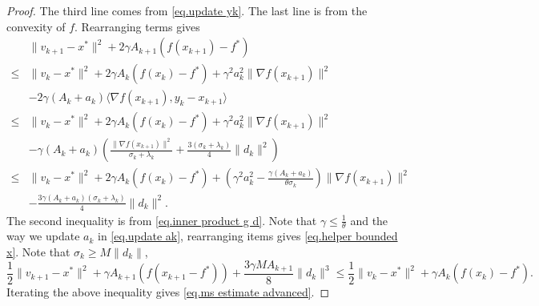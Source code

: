 \documentclass{mcom-l}
\numberwithin{equation}{section}
\begin{document}
\begin{proof}
    The third line comes from \eqref{eq.update yk}. The last line is from the convexity of $f$. Rearranging terms gives
    \begin{equation*}
        \begin{aligned}
                 & \|v_{k+1}-x^*\|^2 +2\gamma A_{k+1} \left (f(x_{k+1})-f^*\right)                                                                                \\
            \leq & \|v_k-x^*\|^2+2\gamma A_k \left (f(x_k)-f^*\right )+\gamma^2 a_k^2 \|\nabla f(x_{k+1})\|^2                                                     \\
                 & -2\gamma \left (A_k+a_k\right)\langle \nabla f(x_{k+1}), y_k-x_{k+1} \rangle                                                                   \\
            \leq & \|v_k-x^*\|^2+2\gamma A_k \left (f(x_k)-f^*\right )+\gamma^2 a_k^2 \|\nabla f(x_{k+1})\|^2                                                     \\
                 & -\gamma \left (A_k+a_k\right)\left (\frac{\|\nabla f(x_{k+1})\|^2}{\sigma_k+\lambda_k}+\frac{3(\sigma_k+\lambda_k)}{4}\|d_k\|^2\right)         \\
            \leq & \|v_k-x^*\|^2+2\gamma A_k \left (f(x_k)-f^*\right )+\left(\gamma^2 a_k^2-\frac{\gamma(A_k+a_k)}{\theta \sigma_k}\right)\|\nabla f(x_{k+1})\|^2 \\
                 & -\frac{3\gamma(A_k+a_k)(\sigma_k+\lambda_k)}{4}\|d_k\|^2.
        \end{aligned}
    \end{equation*}
    The second inequality is from \eqref{eq.inner product g d}. Note that $\gamma \leq \frac{1}{\theta}$ and the way we update $a_k$ in \eqref{eq.update ak}, rearranging items gives \eqref{eq.helper bounded x}.
    Note that $\sigma_k \geq M\|d_k\|$,
    \begin{equation*}
        \frac{1}{2}\|v_{k+1}-x^* \|^2 +\gamma A_{k+1}\left (f(x_{k+1}-f^*)\right)+ \frac{3\gamma M A_{k+1}}{8}\|d_k\|^3 \leq \frac{1}{2}\|v_k-x^*\|^2 +\gamma A_k \left (f(x_k)-f^*\right).
    \end{equation*}
    Iterating the above inequality gives \eqref{eq.ms estimate advanced}.
\end{proof}
\end{document}
